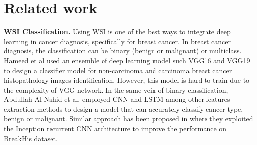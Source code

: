 \documentclass[review]{cvpr}
\begin{document}
\section{Related work}
\noindent \textbf{WSI Classification.} Using WSI is one of the best ways to integrate deep learning in cancer diagnosis, specifically for breast cancer. In breast cancer diagnosis, the classification can be binary (benign or malignant) or multiclass. Hameed et al \cite{s20164373} used an ensemble of deep learning model such VGG16 and VGG19 to design a classifier model for non-carcinoma and carcinoma breast cancer histopathology images identification. However, this model is hard to train due to the complexity of VGG network. In the same vein of binary classification, Abdullah-Al  Nahid et al. \cite{2362108} employed CNN and LSTM among other features extraction methods to design a model that can accurately classify cancer type, benign or malignant. Similar approach has been proposed in \cite{alom2018breast} where they exploited the Inception recurrent CNN architecture to improve the performance on BreakHis dataset\cite{BENHAMMOU20209}.
\end{document}
